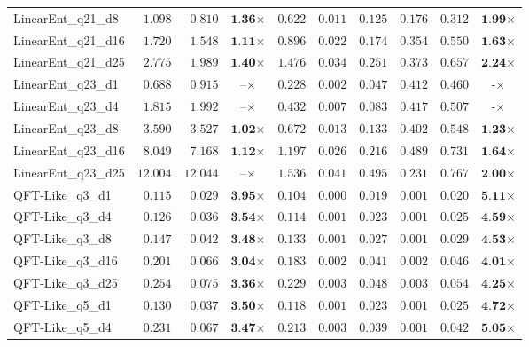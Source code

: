 \begin{table*}[t]
{\begin{tabular}{| l || r r c || r r r r r c |}
LinearEnt\_q21\_d8 & $1.098$ & $0.810$ & $\textbf{1.36}$$\times$ & $0.622$ & $0.011$ & $0.125$ & $0.176$ & $0.312$ & $\textbf{1.99}$$\times$ \\
LinearEnt\_q21\_d16 & $1.720$ & $1.548$ & $\textbf{1.11}$$\times$ & $0.896$ & $0.022$ & $0.174$ & $0.354$ & $0.550$ & $\textbf{1.63}$$\times$ \\
LinearEnt\_q21\_d25 & $2.775$ & $1.989$ & $\textbf{1.40}$$\times$ & $1.476$ & $0.034$ & $0.251$ & $0.373$ & $0.657$ & $\textbf{2.24}$$\times$ \\
LinearEnt\_q23\_d1 & $0.688$ & $0.915$ & $\textbf{--}$$\times$ & $0.228$ & $0.002$ & $0.047$ & $0.412$ & $0.460$ & $\textbf{-}$$\times$ \\
LinearEnt\_q23\_d4 & $1.815$ & $1.992$ & $\textbf{--}$$\times$ & $0.432$ & $0.007$ & $0.083$ & $0.417$ & $0.507$ & $\textbf{-}$$\times$ \\
LinearEnt\_q23\_d8 & $3.590$ & $3.527$ & $\textbf{1.02}$$\times$ & $0.672$ & $0.013$ & $0.133$ & $0.402$ & $0.548$ & $\textbf{1.23}$$\times$ \\
LinearEnt\_q23\_d16 & $8.049$ & $7.168$ & $\textbf{1.12}$$\times$ & $1.197$ & $0.026$ & $0.216$ & $0.489$ & $0.731$ & $\textbf{1.64}$$\times$ \\
LinearEnt\_q23\_d25 & $12.004$ & $12.044$ & $\textbf{--}$$\times$ & $1.536$ & $0.041$ & $0.495$ & $0.231$ & $0.767$ & $\textbf{2.00}$$\times$ \\
QFT-Like\_q3\_d1 & $0.115$ & $0.029$ & $\textbf{3.95}$$\times$ & $0.104$ & $0.000$ & $0.019$ & $0.001$ & $0.020$ & $\textbf{5.11}$$\times$ \\
QFT-Like\_q3\_d4 & $0.126$ & $0.036$ & $\textbf{3.54}$$\times$ & $0.114$ & $0.001$ & $0.023$ & $0.001$ & $0.025$ & $\textbf{4.59}$$\times$ \\
QFT-Like\_q3\_d8 & $0.147$ & $0.042$ & $\textbf{3.48}$$\times$ & $0.133$ & $0.001$ & $0.027$ & $0.001$ & $0.029$ & $\textbf{4.53}$$\times$ \\
QFT-Like\_q3\_d16 & $0.201$ & $0.066$ & $\textbf{3.04}$$\times$ & $0.183$ & $0.002$ & $0.041$ & $0.002$ & $0.046$ & $\textbf{4.01}$$\times$ \\
QFT-Like\_q3\_d25 & $0.254$ & $0.075$ & $\textbf{3.36}$$\times$ & $0.229$ & $0.003$ & $0.048$ & $0.003$ & $0.054$ & $\textbf{4.25}$$\times$ \\
QFT-Like\_q5\_d1 & $0.130$ & $0.037$ & $\textbf{3.50}$$\times$ & $0.118$ & $0.001$ & $0.023$ & $0.001$ & $0.025$ & $\textbf{4.72}$$\times$ \\
QFT-Like\_q5\_d4 & $0.231$ & $0.067$ & $\textbf{3.47}$$\times$ & $0.213$ & $0.003$ & $0.039$ & $0.001$ & $0.042$ & $\textbf{5.05}$$\times$ \\

\end{tabular}}
\end{table*}
